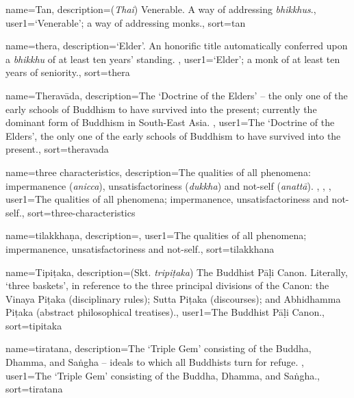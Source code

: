 {
name={Tan},
description={(\textit{Thai}) Venerable. A way of addressing \textit{bhikkhus}.},
user1={`Venerable'; a way of addressing monks.},
sort={tan}
}

{
name={thera},
description={`Elder'. An honorific title automatically conferred upon a \textit{bhikkhu} of at least ten years' standing. \protect \seepre %
\protect {}%
\protect \seepost %
},
user1={`Elder'; a monk of at least ten years of seniority.},
sort={thera}
}

{
name={Therav\=ada},
description={The `Doctrine of the Elders' -- the only one of the early schools of Buddhism to have survived into the present; currently the dominant form of Buddhism in South-East Asia. \protect \seepre %
\protect {}%
\protect \seepost %
},
user1={The `Doctrine of the Elders', the only one of the early schools of Buddhism to have survived into the present.},
sort={theravada}
}

{
name={three characteristics},
description={The qualities of all phenomena: impermanence (\textit{anicca}), unsatisfactoriness (\textit{dukkha}) and not-self (\textit{anatt\=a}). \protect \seepre %
\protect {}, \protect {}, \protect {}%
\protect \seepost %
},
user1={The qualities of all phenomena; impermanence, unsatisfactoriness and not-self.},
sort={three-characteristics}
}

{
name={tilakkha\d{n}a},
description={\nopostdesc},
user1={The qualities of all phenomena; impermanence, unsatisfactoriness and not-self.},
sort={tilakkhana}
}

{
name={Tipi\d{t}aka},
description={(Skt. \textit{tripi\d{t}aka}) The Buddhist P\=a\d{l}i Canon. Literally, `three baskets', in reference to the three principal divisions of the Canon: the Vinaya Pi\d{t}aka (disciplinary rules); Sutta Pi\d{t}aka (discourses); and Abhidhamma Pi\d{t}aka (abstract philosophical treatises).},
user1={The Buddhist P\=a\d{l}i Canon.},
sort={tipitaka}
}

{
name={tiratana},
description={The `Triple Gem' consisting of the Buddha, Dhamma, and Sa\.ngha -- ideals to which all Buddhists turn for refuge. \protect \seepre %
\protect {}%
\protect \seepost %
},
user1={The `Triple Gem' consisting of the Buddha, Dhamma, and Sa\.ngha.},
sort={tiratana}
}

